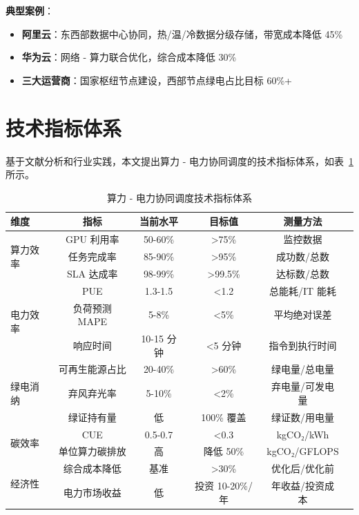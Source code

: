 \documentclass[12pt,a4paper]{article}
\begin{document}
\textbf{典型案例}：
\begin{itemize}
    \item \textbf{阿里云}：东西部数据中心协同，热/温/冷数据分级存储，带宽成本降低 45\%
    \item \textbf{华为云}：网络 - 算力联合优化，综合成本降低 30\%
    \item \textbf{三大运营商}：国家枢纽节点建设，西部节点绿电占比目标 60\%+
\end{itemize}

\section{技术指标体系}
\label{sec:metrics}

基于文献分析和行业实践，本文提出算力 - 电力协同调度的技术指标体系，如表~\ref{tab:metrics}所示。

\begin{table}[h]
\centering
\caption{算力 - 电力协同调度技术指标体系}
\label{tab:metrics}
\begin{tabular}{@{}lccccl@{}}
\toprule
\textbf{维度} & \textbf{指标} & \textbf{当前水平} & \textbf{目标值} & \textbf{测量方法} \\
\midrule
\multirow{3}{*}{算力效率} & GPU 利用率 & 50-60\% & >75\% & 监控数据 \\
& 任务完成率 & 85-90\% & >95\% & 成功数/总数 \\
& SLA 达成率 & 98-99\% & >99.5\% & 达标数/总数 \\
\midrule
\multirow{3}{*}{电力效率} & PUE & 1.3-1.5 & <1.2 & 总能耗/IT 能耗 \\
& 负荷预测 MAPE & 5-8\% & <5\% & 平均绝对误差 \\
& 响应时间 & 10-15 分钟 & <5 分钟 & 指令到执行时间 \\
\midrule
\multirow{3}{*}{绿电消纳} & 可再生能源占比 & 20-40\% & >60\% & 绿电量/总电量 \\
& 弃风弃光率 & 5-10\% & <2\% & 弃电量/可发电量 \\
& 绿证持有量 & 低 & 100\% 覆盖 & 绿证数/用电量 \\
\midrule
\multirow{2}{*}{碳效率} & CUE & 0.5-0.7 & <0.3 & kgCO₂/kWh \\
& 单位算力碳排放 & 高 & 降低 50\% & kgCO₂/GFLOPS \\
\midrule
\multirow{2}{*}{经济性} & 综合成本降低 & 基准 & >30\% & 优化后/优化前 \\
& 电力市场收益 & 低 & 投资 10-20\%/年 & 年收益/投资成本 \\
\bottomrule
\end{tabular}
\end{table}
\end{document}
